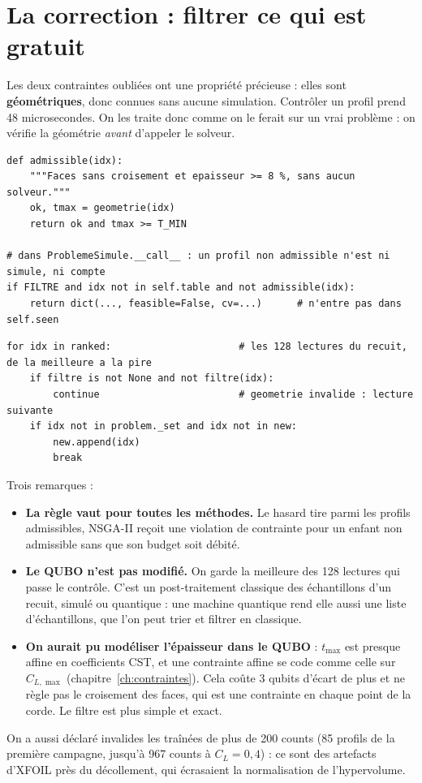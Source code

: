 \section{La correction : filtrer ce qui est gratuit}
Les deux contraintes oubliées ont une propriété précieuse : elles sont \textbf{géométriques}, donc connues sans aucune simulation. Contrôler un profil prend 48 microsecondes. On les traite donc comme on le ferait sur un vrai problème : on vérifie la géométrie \emph{avant} d'appeler le solveur.
\begin{codebox}
\begin{lstlisting}
def admissible(idx):
    """Faces sans croisement et epaisseur >= 8 %, sans aucun solveur."""
    ok, tmax = geometrie(idx)
    return ok and tmax >= T_MIN

# dans ProblemeSimule.__call__ : un profil non admissible n'est ni simule, ni compte
if FILTRE and idx not in self.table and not admissible(idx):
    return dict(..., feasible=False, cv=...)      # n'entre pas dans self.seen
\end{lstlisting}
\end{codebox}
\begin{codebox}
\begin{lstlisting}
for idx in ranked:                      # les 128 lectures du recuit, de la meilleure a la pire
    if filtre is not None and not filtre(idx):
        continue                        # geometrie invalide : lecture suivante
    if idx not in problem._set and idx not in new:
        new.append(idx)
        break
\end{lstlisting}
\end{codebox}
Trois remarques :
\begin{itemize}
\item \textbf{La règle vaut pour toutes les méthodes.} Le hasard tire parmi les profils admissibles, NSGA-II reçoit une violation de contrainte pour un enfant non admissible sans que son budget soit débité.
\item \textbf{Le QUBO n'est pas modifié.} On garde la meilleure des 128 lectures qui passe le contrôle. C'est un post-traitement classique des échantillons d'un recuit, simulé ou quantique : une machine quantique rend elle aussi une liste d'échantillons, que l'on peut trier et filtrer en classique.
\item \textbf{On aurait pu modéliser l'épaisseur dans le QUBO} : $t_{\max}$ est presque affine en coefficients CST, et une contrainte affine se code comme celle sur $C_{L,\max}$ (chapitre~\ref{ch:contraintes}). Cela coûte 3 qubits d'écart de plus et ne règle pas le croisement des faces, qui est une contrainte en chaque point de la corde. Le filtre est plus simple et exact.
\end{itemize}
On a aussi déclaré invalides les traînées de plus de 200 counts (85 profils de la première campagne, jusqu'à 967 counts à $C_L=0{,}4$) : ce sont des artefacts d'XFOIL près du décollement, qui écrasaient la normalisation de l'hypervolume.

